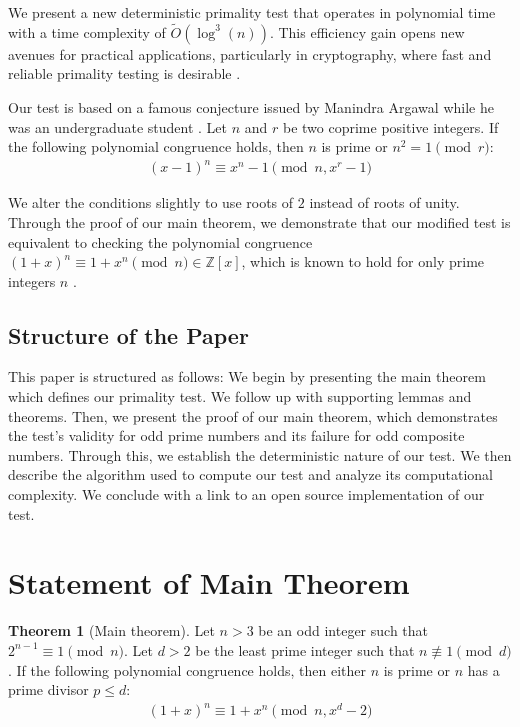 \documentclass{article}
\theoremstyle{plain}
\theoremstyle{definition}
\newtheorem{theorem}{Theorem}
\begin{document}
We present a new deterministic primality test that operates in polynomial time with a time complexity of $\tilde{O}(\log^3(n))$. This efficiency gain opens new avenues for practical applications, particularly in cryptography, where fast and reliable primality testing is desirable \cite{pomerance1984}. 

Our test is based on a famous conjecture issued by Manindra Argawal while he was an undergraduate student \cite{aks2002}. Let $n$ and $r$ be two coprime positive integers. If the following polynomial congruence holds, then $n$ is prime or $n^2 = 1 \pmod{r}$:
\begin{align}
    (x - 1)^n \equiv x^n - 1 \pmod{n, x^r - 1}
\end{align}

We alter the conditions slightly to use roots of $2$ instead of roots of unity. Through the proof of our main theorem, we demonstrate that our modified test is equivalent to checking the polynomial congruence $(1 + x)^n \equiv 1 + x^n \pmod{n} \in \mathbb{Z}[x]$, which is known to hold for only prime integers $n$ \cite{granville2004primes}.

\subsection{Structure of the Paper}
This paper is structured as follows: We begin by presenting the main theorem which defines our primality test. We follow up with supporting lemmas and theorems. Then, we present the proof of our main theorem, which demonstrates the test's validity for odd prime numbers and its failure for odd composite numbers. Through this, we establish the deterministic nature of our test. We then describe the algorithm used to compute our test and analyze its computational complexity. We conclude with a link to an open source implementation of our test.

\section{Statement of Main Theorem}
\begin{theorem}[Main theorem]
\label{theorem:main}
Let $n > 3$ be an odd integer such that $2^{n-1} \equiv 1 \pmod{n}$. Let $d > 2$ be the least prime integer such that $n \not\equiv 1 \pmod{d}$. If the following polynomial congruence holds, then either $n$ is prime or $n$ has a prime divisor $p \leq d$:
\begin{align}
(1 + x)^n \equiv 1 + x^n \pmod{n, x^d - 2}
\end{align}
\end{theorem}
\end{document}
